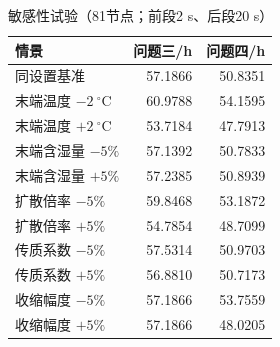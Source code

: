 \begin{table}[!htbp]\centering
\caption{敏感性试验（81节点；前段2 s、后段20 s）}
\begin{tabular}{lrr}\toprule
情景 & 问题三/h & 问题四/h\\\midrule
同设置基准 & 57.1866 & 50.8351\\
末端温度 $-2~^\circ$C & 60.9788 & 54.1595\\
末端温度 $+2~^\circ$C & 53.7184 & 47.7913\\
末端含湿量 $-5\%$ & 57.1392 & 50.7833\\
末端含湿量 $+5\%$ & 57.2385 & 50.8939\\
扩散倍率 $-5\%$ & 59.8468 & 53.1872\\
扩散倍率 $+5\%$ & 54.7854 & 48.7099\\
传质系数 $-5\%$ & 57.5314 & 50.9703\\
传质系数 $+5\%$ & 56.8810 & 50.7173\\
收缩幅度 $-5\%$ & 57.1866 & 53.7559\\
收缩幅度 $+5\%$ & 57.1866 & 48.0205\\
\bottomrule\end{tabular}\end{table}
